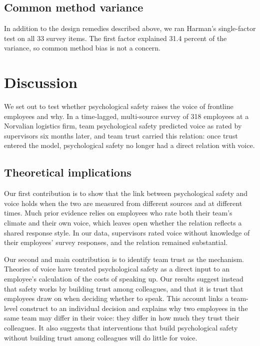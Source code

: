 \documentclass[11pt]{article}
\begin{document}
\subsection{Common method variance}

In addition to the design remedies described above, we ran Harman's single-factor test on all 33 survey items. The first factor explained 31.4 percent of the variance, so common method bias is not a concern.

\section{Discussion}

We set out to test whether psychological safety raises the voice of frontline employees and why. In a time-lagged, multi-source survey of 318 employees at a Norvalian logistics firm, team psychological safety predicted voice as rated by supervisors six months later, and team trust carried this relation: once trust entered the model, psychological safety no longer had a direct relation with voice.

\subsection{Theoretical implications}

Our first contribution is to show that the link between psychological safety and voice holds when the two are measured from different sources and at different times. Much prior evidence relies on employees who rate both their team's climate and their own voice, which leaves open whether the relation reflects a shared response style. In our data, supervisors rated voice without knowledge of their employees' survey responses, and the relation remained substantial.

Our second and main contribution is to identify team trust as the mechanism. Theories of voice have treated psychological safety as a direct input to an employee's calculation of the costs of speaking up. Our results suggest instead that safety works by building trust among colleagues, and that it is trust that employees draw on when deciding whether to speak. This account links a team-level construct to an individual decision and explains why two employees in the same team may differ in their voice: they differ in how much they trust their colleagues. It also suggests that interventions that build psychological safety without building trust among colleagues will do little for voice.
\end{document}
